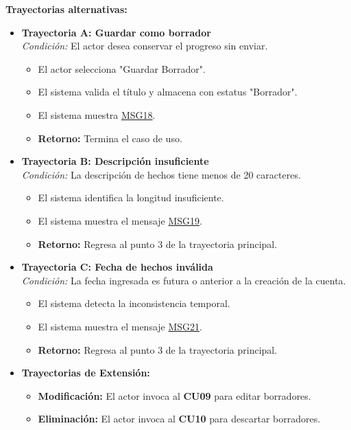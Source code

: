 \begin{appendices}
\textbf{Trayectorias alternativas:}
\begin{itemize}[leftmargin=*]
    \item \textbf{Trayectoria A: Guardar como borrador} \\
    \textit{Condición:} El actor desea conservar el progreso sin enviar.
    \begin{itemize}[nosep]
        \item[A-1:] El actor selecciona "Guardar Borrador".
        \item[A-2:] El sistema valida el título y almacena con estatus "Borrador".
        \item[A-3:] El sistema muestra \hyperlink{msg:MSG18}{MSG18}.
        \item \textbf{Retorno:} Termina el caso de uso.
    \end{itemize}
    \item \textbf{Trayectoria B: Descripción insuficiente} \\
    \textit{Condición:} La descripción de hechos tiene menos de 20 caracteres.
    \begin{itemize}[nosep]
        \item[B-1:] El sistema identifica la longitud insuficiente.
        \item[B-2:] El sistema muestra el mensaje \hyperlink{msg:MSG19}{MSG19}.
        \item \textbf{Retorno:} Regresa al punto 3 de la trayectoria principal.
    \end{itemize}
    \item \textbf{Trayectoria C: Fecha de hechos inválida} \\
    \textit{Condición:} La fecha ingresada es futura o anterior a la creación de la cuenta.
    \begin{itemize}[nosep]
        \item[C-1:] El sistema detecta la inconsistencia temporal.
        \item[C-2:] El sistema muestra el mensaje \hyperlink{msg:MSG21}{MSG21}.
        \item \textbf{Retorno:} Regresa al punto 3 de la trayectoria principal.
    \end{itemize}
    \item \textbf{Trayectorias de Extensión:}
    \begin{itemize}[nosep]
        \item \textbf{Modificación:} El actor invoca al \textbf{CU09} para editar borradores.
        \item \textbf{Eliminación:} El actor invoca al \textbf{CU10} para descartar borradores.
    \end{itemize}
\end{itemize}


\end{appendices}

